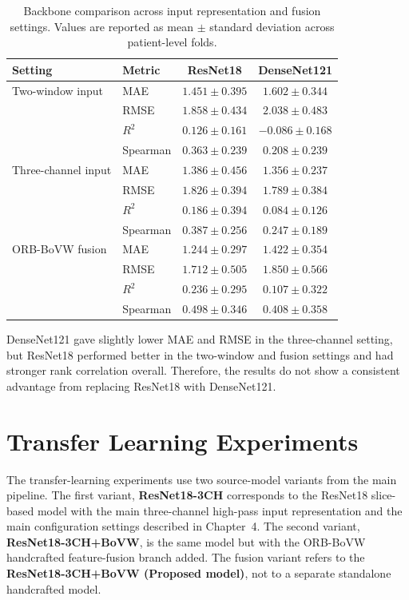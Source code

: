 \begin{table}[H]
\centering
\caption{Backbone comparison across input representation and fusion settings. Values are reported as mean \(\pm\) standard deviation across patient-level folds.}
\label{tab:backbone_comparison_results}
\small
\begin{tabular}{llcc}
\toprule
Setting & Metric & ResNet18 & DenseNet121 \\
\midrule
Two-window input & MAE & \(1.451 \pm 0.395\) & \(1.602 \pm 0.344\) \\
 & RMSE & \(1.858 \pm 0.434\) & \(2.038 \pm 0.483\) \\
 & \(R^2\) & \(0.126 \pm 0.161\) & \(-0.086 \pm 0.168\) \\
 & Spearman & \(0.363 \pm 0.239\) & \(0.208 \pm 0.239\) \\
\midrule
Three-channel input & MAE & \(1.386 \pm 0.456\) & \(1.356 \pm 0.237\) \\
 & RMSE & \(1.826 \pm 0.394\) & \(1.789 \pm 0.384\) \\
 & \(R^2\) & \(0.186 \pm 0.394\) & \(0.084 \pm 0.126\) \\
 & Spearman & \(0.387 \pm 0.256\) & \(0.247 \pm 0.189\) \\
\midrule
ORB-BoVW fusion & MAE & \(1.244 \pm 0.297\) & \(1.422 \pm 0.354\) \\
 & RMSE & \(1.712 \pm 0.505\) & \(1.850 \pm 0.566 \) \\
 & \(R^2\) & \(0.236 \pm 0.295\) & \(0.107 \pm 0.322\) \\
 & Spearman & \(0.498 \pm 0.346\) & \(0.408 \pm 0.358\) \\
\bottomrule
\end{tabular}
\end{table}

DenseNet121 gave slightly lower MAE and RMSE in the three-channel setting, but ResNet18 performed better in the two-window and fusion settings and had stronger rank correlation overall. Therefore, the results do not show a consistent advantage from replacing ResNet18 with DenseNet121.



\section{Transfer Learning Experiments}
\label{sec:transfer_learning_experiments}

The transfer-learning experiments use two source-model variants from the main pipeline. The first variant, \textbf{ResNet18-3CH} corresponds to the ResNet18 slice-based model with the main three-channel high-pass input representation and the main configuration settings described in Chapter~4. The second variant, \textbf{ResNet18-3CH+BoVW}, is the same model but with the ORB-BoVW handcrafted feature-fusion branch added. The fusion variant refers to the \textbf{ResNet18-3CH+BoVW (Proposed model)}, not to a separate standalone handcrafted model.

